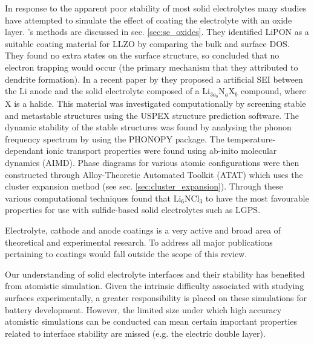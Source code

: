 \documentclass[../main.tex]{subfiles}
\begin{document}
In response to the apparent poor stability of most solid electrolytes many studies have attempted to simulate the effect of coating the electrolyte with an oxide layer\cite{Zhang2020directvis, Xiao2019coat, Tian2018}. \citeauthor{Tian2018}'s methods are discussed in sec. \ref{sec:se_oxides}. They identified LiPON as a suitable coating material for LLZO by comparing the bulk and surface DOS\cite{Tian2018}. They found no extra states on the surface structure, so concluded that no electron trapping would occur (the primary mechanism that they attributed to dendrite formation). In a recent paper by \citeauthor{Sang2020} they proposed a artificial SEI between the Li anode and the solid electrolyte composed of a Li$_{3a_b}$N$_a$X$_b$ compound, where X is a halide.\cite{Sang2020} 
This material was investigated computationally by screening stable and metastable structures using the USPEX structure prediction software.\cite{Glass2006, Oganov2006} The dynamic stability of the stable structures was found by analysing the phonon frequency spectrum by using the PHONOPY package.\cite{Parlinski1997, Togo2008} The temperature-dependant ionic transport properties were found using ab-inito molecular dynamics (AIMD). 
Phase diagrams for various atomic configurations were then constructed through Alloy-Theoretic Automated Toolkit (ATAT) which uses the cluster expansion method (see sec. \ref{sec:cluster_expansion}).\cite{Hart2008, VandeWalle2002} Through these various computational techniques \citeauthor{Sang2020} found that Li$_6$NCl$_3$ to have the most favourable properties for use with sulfide-based solid electrolytes such as LGPS. 

Electrolyte, cathode and anode coatings is a very active and broad area of theoretical and experimental research. To address all major publications pertaining to coatings would fall outside the scope of this review. 

Our understanding of solid electrolyte interfaces and their stability has benefited from atomistic simulation. Given the intrinsic difficulty associated with studying surfaces experimentally, a greater responsibility is placed on these simulations for battery development. However, the limited size under which high accuracy atomistic simulations can be conducted can mean certain important properties related to interface stability are missed (e.g. the electric double layer\cite{Tateyama2019}).
\end{document}

